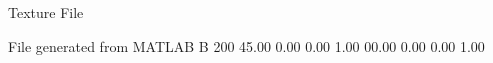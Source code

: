 Texture File

File generated from MATLAB
B 200
   45.00   0.00   0.00   1.00
   00.00   0.00   0.00   1.00

